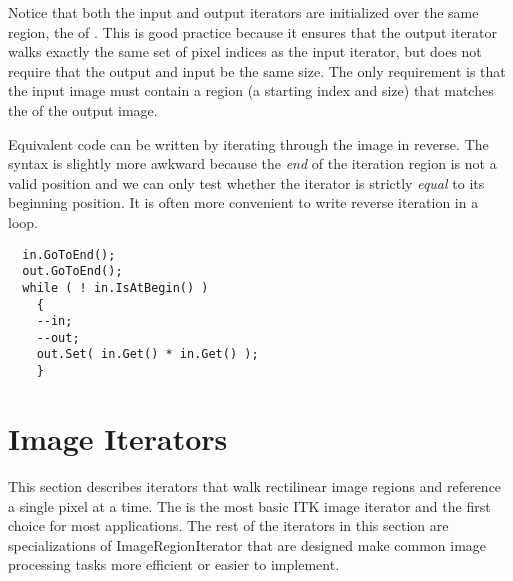 Notice that both the input and output iterators are initialized over the same
region, the  of .  This is good
practice because it ensures that the output iterator walks exactly the same set
of pixel indices as the input iterator, but does not require that the output
and input be the same size. The only requirement is that the input image
must contain a region (a starting index and size) that matches the
 of the output image.

Equivalent code can be written by iterating through the image in reverse.
The syntax is slightly more awkward because the \emph{end} of the
iteration region is not a valid position and we can only test whether the
iterator is strictly \emph{equal} to its beginning position.  It is often more
convenient to write reverse iteration in a  loop.

\small
\begin{verbatim}
  in.GoToEnd();
  out.GoToEnd();
  while ( ! in.IsAtBegin() )
    {
    --in;
    --out;
    out.Set( in.Get() * in.Get() );
    }
\end{verbatim}
\normalsize





\section{Image Iterators}
\label{sec:ImageIterators}
This section describes iterators that walk rectilinear image regions and
reference a single pixel at a time.  The  is the
most basic ITK image iterator and the first choice for most applications. The
rest of the iterators in this section are specializations of
ImageRegionIterator that are designed make common image processing
tasks more efficient or easier to implement.

